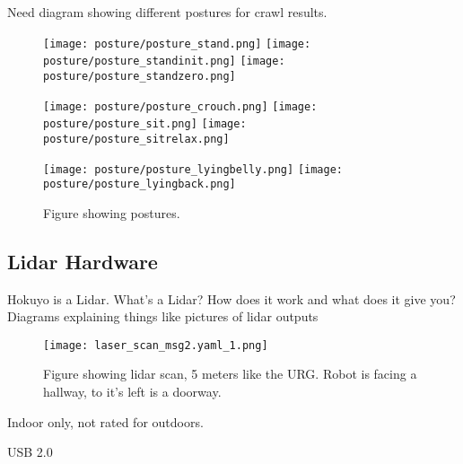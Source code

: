 Need diagram showing different postures for crawl results. 
\begin{figure}
\centerline{\texttt{[image: posture/posture\_stand.png]}
            \texttt{[image: posture/posture\_standinit.png]}
            \texttt{[image: posture/posture\_standzero.png]}
}
\vspace*{0.05in}
\centerline{\texttt{[image: posture/posture\_crouch.png]}
            \texttt{[image: posture/posture\_sit.png]}
            \texttt{[image: posture/posture\_sitrelax.png]}
}
\vspace*{0.05in}
\centerline{\texttt{[image: posture/posture\_lyingbelly.png]}
            \texttt{[image: posture/posture\_lyingback.png]}
}
\caption{Figure showing postures.}
\label{fig:nao_postures1}
\end{figure}

\subsection{Lidar Hardware}
Hokuyo is a Lidar. What's a Lidar? How does it work and what does it give you? 
{Diagrams explaining things like pictures of lidar outputs}

\begin{figure}
\centering
\texttt{[image: laser\_scan\_msg2.yaml\_1.png]}
\caption{Figure showing lidar scan, 5 meters like the URG\@.
         Robot is facing a hallway, to it's left is a doorway.}
\label{fig:lidar_scan1}
\end{figure}

Indoor only, not rated for outdoors.

USB 2.0


